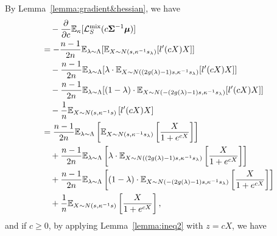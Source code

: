 By Lemma~\ref{lemma:gradient&hessian}, we have
\begin{align*}
    &\quad - \frac{\partial}{\partial c}\mathbb{E}_\kappa[\mathcal{L}_S^\mathrm{mix}(c {\bm{\Sigma}}^{-1} {\bm{\mu}})]\\
    &= -\frac{n-1}{2n} \mathbb{E}_{\lambda \sim \Lambda}[\mathbb{E}_{X \sim N(s, \kappa^{-1} s_\lambda) } [l'(c X)X]] \\
    &\quad- \frac{n-1}{2n} \mathbb{E}_{\lambda \sim \Lambda}[\lambda \cdot \mathbb{E}_{X \sim N((2g(\lambda)-1)s, \kappa^{-1} s_\lambda) }[ l'(cX)X]] \\
    &\quad- \frac{n-1}{2n} \mathbb{E}_{\lambda \sim \Lambda}[(1-\lambda)\cdot\mathbb{E}_{X \sim N(-(2g(\lambda)-1)s, \kappa^{-1} s_\lambda) }[ l'(cX)X]] \\
    &\quad- \frac{1}{n} \mathbb{E}_{X \sim N(s, \kappa^{-1}s) }\left[  l'(cX)X\right]\\
    &= \frac{n-1}{2n} \mathbb{E}_{\lambda \sim \Lambda}\left[\mathbb{E}_{X \sim N(s, \kappa^{-1} s_\lambda) } \left[\frac{X}{1+e^{cX}}\right]\right] \\
    &\quad+ \frac{n-1}{2n} \mathbb{E}_{\lambda \sim \Lambda}\left[\lambda \cdot \mathbb{E}_{X \sim N((2g(\lambda)-1)s, \kappa^{-1} s_\lambda) }\left[\frac{X}{1+e^{cX}}\right]\right] \\
    &\quad+ \frac{n-1}{2n} \mathbb{E}_{\lambda \sim \Lambda}\left[(1-\lambda) \cdot\mathbb{E}_{X \sim N(-(2g(\lambda)-1)s, \kappa^{-1} s_\lambda) }\left[\frac{X}{1+e^{cX} }\right]\right] \\
    &\quad+ \frac{1}{n} \mathbb{E}_{X \sim N(s,\kappa^{-1}s) }\left[\frac{X}{1+e^{cX} }\right],
\end{align*}
and if $c\geq 0$,  by applying Lemma~\ref{lemma:ineq2} with $z= cX$, we have
